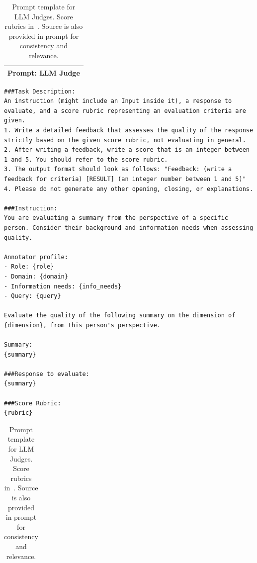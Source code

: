 \begin{table}[h]
\centering
\footnotesize
\begin{tabular}{p{}}
\toprule
\textbf{Prompt: LLM Judge} \\
\midrule
\end{tabular}
\begin{lstlisting}[style=promptstyle]
###Task Description:
An instruction (might include an Input inside it), a response to evaluate, and a score rubric representing an evaluation criteria are given.
1. Write a detailed feedback that assesses the quality of the response strictly based on the given score rubric, not evaluating in general.
2. After writing a feedback, write a score that is an integer between 1 and 5. You should refer to the score rubric.
3. The output format should look as follows: "Feedback: (write a feedback for criteria) [RESULT] (an integer number between 1 and 5)"
4. Please do not generate any other opening, closing, or explanations.

###Instruction:
You are evaluating a summary from the perspective of a specific person. Consider their background and information needs when assessing quality.

Annotator profile:
- Role: {role}
- Domain: {domain}
- Information needs: {info_needs}
- Query: {query}

Evaluate the quality of the following summary on the dimension of {dimension}, from this person's perspective.

Summary:
{summary}

###Response to evaluate:
{summary}

###Score Rubric:
{rubric}
\end{lstlisting}
\begin{tabular}{p{\textwidth}}
\bottomrule
\end{tabular}
\caption{Prompt template for LLM Judges. Score rubrics in~. Source is also provided in prompt for consistency and relevance.}\label{tab:ch-7-prompt-llm-judge}
\end{table}

